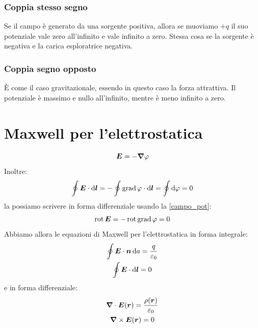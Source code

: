 \subsubsection{Coppia stesso segno}
Se il campo è generato da una sorgente positiva, allora se muoviamo $+q$ il suo potenziale vale zero all'infinito e vale infinito a zero. Stessa cosa se la sorgente è negativa e la carica esploratrice negativa.
\subsubsection{Coppia segno opposto}
\`E come il caso gravitazionale, essendo in questo caso la forza attrattiva. Il potenziale è massimo e nullo all'infinito, mentre è meno infinito a zero.
\section{Maxwell per l'elettrostatica}
\begin{equation}
\boldsymbol{E}=-\boldsymbol{\nabla}\varphi
\label{campo_pot}
\end{equation}
Inoltre:
\begin{equation*}\oint\boldsymbol{E}\cdot\mathrm{d}\boldsymbol{l}=-\oint\operatorname{grad}\varphi\cdot\mathrm{d}\boldsymbol{l}=\oint\mathrm{d}\varphi=0\end{equation*}
la possiamo scrivere in forma differenziale usando la \eqref{campo_pot}:
\begin{equation*}\operatorname{rot}\boldsymbol{E}=-\operatorname{rot}\operatorname{grad}\varphi=0\end{equation*}
Abbiamo allora le equazioni di Maxwell per l'elettrostatica in forma integrale:
\begin{subequations}
\begin{gather}
\oint\boldsymbol{E}\cdot\boldsymbol{n}\,\mathrm{d} a=\frac{q}{\varepsilon_0}\\
\oint\boldsymbol{E}\cdot\mathrm{d}\boldsymbol{l}=0
\end{gather}
\end{subequations}
e in forma differenziale:
\begin{subequations}
\begin{gather}
\boldsymbol{\nabla}\cdot\boldsymbol{E}(\boldsymbol{r})=\frac{\rho(\boldsymbol{r})}{\varepsilon_0}\\
\boldsymbol{\nabla}\times \boldsymbol{E}(\boldsymbol{r})=0
\end{gather}
\end{subequations}
